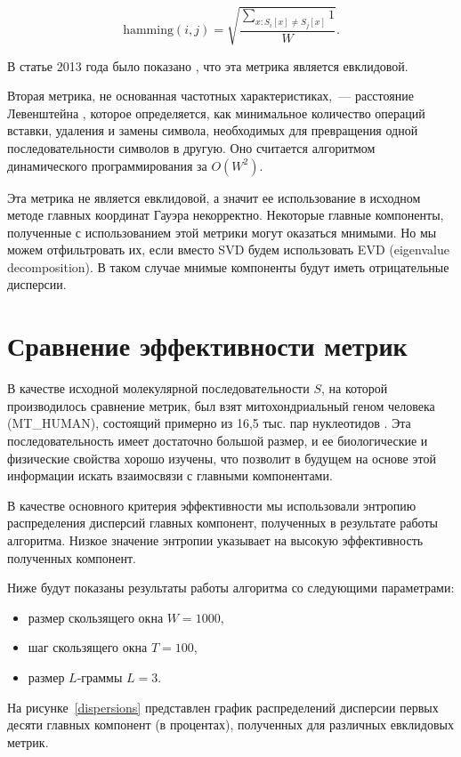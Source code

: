 $$\text{hamming}(i, j) = \sqrt{\frac{\sum_{x: S_i[x]\neq S_j[x]} 1}{W}}.$$

В статье 2013 года было показано \cite{Efimov2013}, что эта метрика является евклидовой.

Вторая метрика, не основанная частотных характеристиках,~--- расстояние Левенштейна \cite{levenshtein1965}, которое определяется, как минимальное количество операций вставки, удаления и замены символа, необходимых для превращения одной последовательности символов в другую. Оно считается алгоритмом динамического программирования за $O(W^2)$.

Эта метрика не является евклидовой, а значит ее использование в исходном методе главных координат Гауэра некорректно. Некоторые главные компоненты, полученные с использованием этой метрики могут оказаться мнимыми. Но мы можем отфильтровать их, если вместо SVD будем использовать EVD (eigenvalue decomposition). В таком случае мнимые компоненты будут иметь отрицательные дисперсии.

\section{Сравнение эффективности метрик}

В качестве исходной молекулярной последовательности $S$, на которой производилось сравнение метрик, был взят митохондриальный геном человека (MT\_HUMAN), состоящий примерно из 16,5 тыс. пар нуклеотидов \cite{Anderson1981}. Эта последовательность имеет достаточно большой размер, и ее биологические и физические свойства хорошо изучены, что позволит в будущем на основе этой информации искать взаимосвязи с главными компонентами.

В качестве основного критерия эффективности мы использовали энтропию распределения дисперсий главных компонент, полученных в результате работы алгоритма. Низкое значение энтропии указывает на высокую эффективность полученных компонент.

Ниже будут показаны результаты работы алгоритма со следующими параметрами:
\begin{itemize}
  \item размер скользящего окна $W = 1000$,
  \item шаг скользящего окна $T = 100$,
  \item размер $L$-граммы $L = 3$.
\end{itemize}

На рисунке~\ref{dispersions} представлен график распределений дисперсии первых десяти главных компонент (в процентах), полученных для различных евклидовых метрик.

